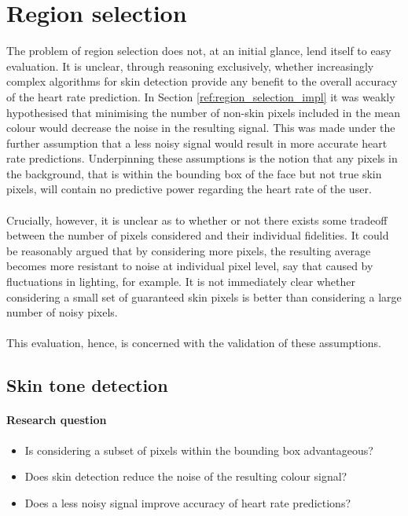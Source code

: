 
\section{Region selection}
\label{section:region_selection}
The problem of region selection does not, at an initial glance, lend itself to easy evaluation.
It is unclear, through reasoning exclusively, whether increasingly complex algorithms for skin detection provide any benefit to the overall accuracy of the heart rate prediction.
In Section \ref{ref:region_selection_impl} it was weakly hypothesised that minimising the number of non-skin pixels included in the mean colour would decrease the noise in the resulting signal. 
This was made under the further assumption that a less noisy signal would result in more accurate heart rate predictions. 
Underpinning these assumptions is the notion that any pixels in the background, that is within the bounding box of the face but not true skin pixels, will contain no predictive power regarding the heart rate of the user.
\\\\
Crucially, however, it is unclear as to whether or not there exists some tradeoff between the number of pixels considered and their individual fidelities. 
It could be reasonably argued that by considering more pixels, the resulting average becomes more resistant to noise at individual pixel level, say that caused by fluctuations in lighting, for example.
It is not immediately clear whether considering a small set of guaranteed skin pixels is better than considering a large number of noisy pixels.
\\\\
This evaluation, hence, is concerned with the validation of these assumptions.
\subsection{Skin tone detection}
\label{section:skin_tone_detection}
\paragraph{Research question}
\begin{itemize}
   \item Is considering a subset of pixels within the bounding box advantageous? 
   \item Does skin detection reduce the noise of the resulting colour signal?
   \item Does a less noisy signal improve accuracy of heart rate predictions?
\end{itemize}

